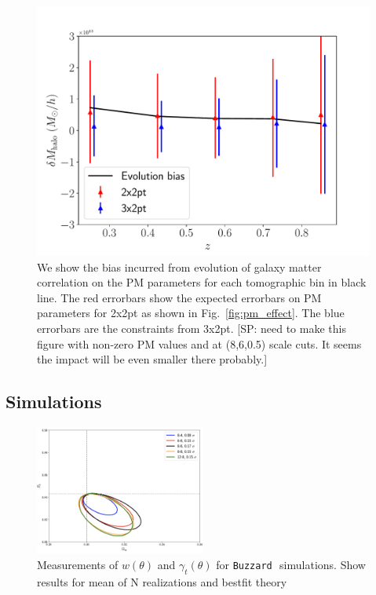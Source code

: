 \documentclass[fleqn,usenatbib]{mnras}
\newcommand{\gammat}{\ensuremath{\gamma_{t}(\theta)} }
\newcommand{\wtheta}{\ensuremath{w(\theta)} }
\newcommand{\buzzard}{\texttt{Buzzard}\,}
\newcommand{\SP}[1]{{\color{red}[SP: #1]}}
\begin{document}
\begin{figure}
\includegraphics[width=\columnwidth]{figs/PM_evolve_impact.pdf}
\caption[]{We show the bias incurred from evolution of galaxy matter correlation on the PM parameters for each tomographic bin in black line. The red errorbars show the expected errorbars on PM parameters for 2x2pt as shown in Fig.~\ref{fig:pm_effect}. The blue errorbars are the constraints from 3x2pt. \SP{need to make this figure with non-zero PM values and at (8,6,0.5) scale cuts. It seems the impact will be even smaller there probably.}
}
\label{fig:pm_evolve}
\end{figure}




\subsection{Simulations}

\begin{figure}
\includegraphics[width=0.5\textwidth,draft]{figs/temp.png}
\caption[]{Measurements of \wtheta and \gammat for \buzzard \ simulations. Show results for mean of N realizations and bestfit theory }
\label{fig:buzzard_2pt}
\end{figure}
\end{document}
